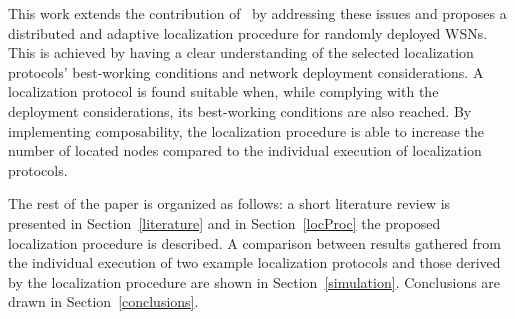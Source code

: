 
This work extends the contribution of~\cite{composability} by addressing these issues and proposes a distributed and adaptive localization procedure for randomly deployed WSNs. This is achieved by having a clear understanding of the selected localization protocols' best-working conditions and network deployment considerations. A localization protocol is found suitable when, while complying with the deployment considerations, its best-working conditions are also reached. By implementing composability, the localization procedure is able to increase the number of located nodes compared to the individual execution of localization protocols.

The rest of the paper is organized as follows: a short literature review is presented in Section~\ref{literature} and in Section~\ref{locProc} the proposed localization procedure is described. A comparison between results gathered from the individual execution of two example localization protocols and those derived by the localization procedure are shown in Section~\ref{simulation}. Conclusions are drawn in Section~\ref{conclusions}.